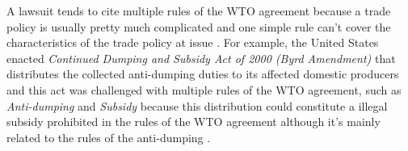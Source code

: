 A lawsuit tends to cite multiple rules of the WTO agreement because a trade policy is usually pretty much complicated
and one simple rule can't cover the characteristics of the trade policy at issue \citep{palmeter2004dispute}.
For example, the United States enacted \textit{Continued Dumping and Subsidy Act of 2000 (Byrd Amendment)} that distributes
the collected anti-dumping duties to its affected domestic producers and this act was challenged with multiple rules of the WTO agreement,
such as \textit{Anti-dumping} and \textit{Subsidy} because
this distribution could constitute a illegal subsidy prohibited
in the rules of the WTO agreement although it's mainly related to the rules of the anti-dumping \citep{cdsoa}.
 

